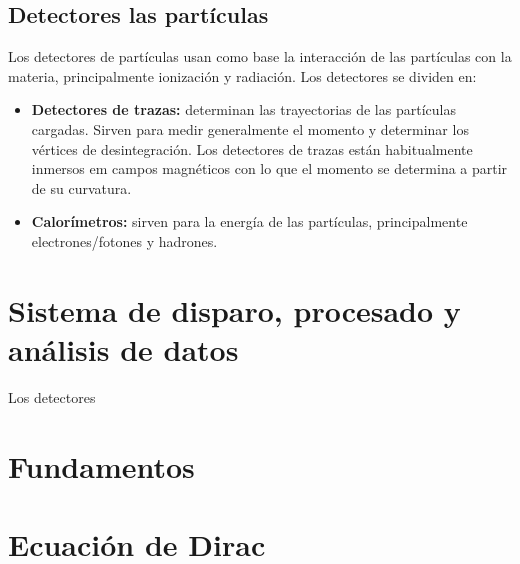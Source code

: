 \subsection{Detectores las partículas}

Los detectores de partículas usan como base la interacción de las partículas con la materia, principalmente ionización y radiación. Los detectores se dividen en:

\begin{itemize}
	\item \textbf{Detectores de trazas:} determinan las trayectorias de las partículas cargadas. Sirven para medir generalmente el momento y determinar los vértices de desintegración. Los detectores de trazas están habitualmente inmersos em campos magnéticos con lo que el momento se determina a partir de su curvatura.
	\item \textbf{Calorímetros:} sirven para la energía de las partículas, principalmente electrones/fotones y hadrones.
\end{itemize}


\section{Sistema de disparo, procesado y análisis de datos}

Los detectores 



\section{Fundamentos}


\section{Ecuación de Dirac}